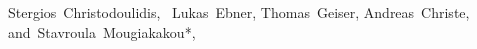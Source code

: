 \documentclass[journal]{IEEEtran}
\begin{document}
        Stergios~Christodoulidis,~
        Lukas~Ebner,
        Thomas~Geiser,
        Andreas~Christe,
        and~Stavroula~Mougiakakou*,~%

%
%
\end{document}
